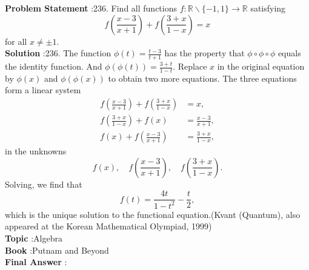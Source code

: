 \documentclass[10pt]{article}
\begin{document}
\textbf{Problem Statement} :236. Find all functions $f: \mathbb{R} \backslash\{-1,1\} \rightarrow \mathbb{R}$ satisfying$$ f\left(\frac{x-3}{x+1}\right)+f\left(\frac{3+x}{1-x}\right)=x $$for all $x \neq \pm 1$.\\
\textbf{Solution} :236. The function $\phi(t)=\frac{t-3}{t+1}$ has the property that $\phi \circ \phi \circ \phi$ equals the identity function. And $\phi(\phi(t))=\frac{3+t}{1-t}$. Replace $x$ in the original equation by $\phi(x)$ and $\phi(\phi(x))$ to obtain two more equations. The three equations form a linear system$$ \begin{aligned} f\left(\frac{x-3}{x+1}\right)+f\left(\frac{3+x}{1-x}\right) &=x, \\ f\left(\frac{3+x}{1-x}\right)+f(x) &=\frac{x-3}{x+1}, \\ f(x)+f\left(\frac{x-3}{x+1}\right) &=\frac{3+x}{1-x}, \end{aligned} $$in the unknowns$$ f(x), \quad f\left(\frac{x-3}{x+1}\right), \quad f\left(\frac{3+x}{1-x}\right) . $$Solving, we find that$$ f(t)=\frac{4 t}{1-t^{2}}-\frac{t}{2}, $$which is the unique solution to the functional equation.(Kvant (Quantum), also appeared at the Korean Mathematical Olympiad, 1999)\\
\textbf{Topic} :Algebra\\
\textbf{Book} :Putnam and Beyond\\
\textbf{Final Answer} :\\
\end{document}
